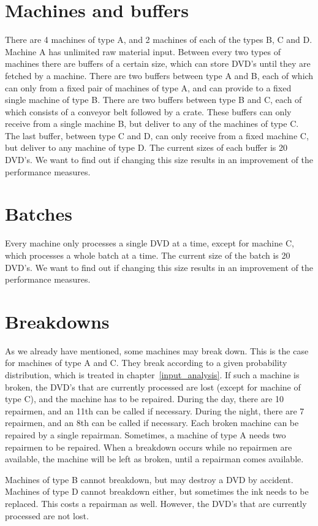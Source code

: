 \documentclass{report}
\begin{document}
\section{Machines and buffers}
There are 4 machines of type A, and 2 machines of each of the types B, C and D.
Machine A has unlimited raw material input.
Between every two types of machines there are buffers of a certain size, which can store DVD's until they are fetched by a machine.
There are two buffers between type A and B, each of which can only from a fixed pair of machines of type A, and can provide to a fixed single machine of type B.
There are two buffers between type B and C, each of which consists of a conveyor belt followed by a crate.
These buffers can only receive from a single machine B, but deliver to any of the machines of type C.
The last buffer, between type C and D, can only receive from a fixed machine C, but deliver to any machine of type D.
The current sizes of each buffer is 20 DVD's.
We want to find out if changing this size results in an improvement of the performance measures.

\section{Batches}
Every machine only processes a single DVD at a time, except for machine C, which processes a whole batch at a time.
The current size of the batch is 20 DVD's.
We want to find out if changing this size results in an improvement of the performance measures.

\section{Breakdowns}
As we already have mentioned, some machines may break down.
This is the case for machines of type A and C.
They break according to a given probability distribution, which is treated in chapter~\ref{input_analysis}.
If such a machine is broken, the DVD's that are currently processed are lost (except for machine of type C), and the machine has to be repaired.
During the day, there are 10 repairmen, and an 11th can be called if necessary.
During the night, there are 7 repairmen, and an 8th can be called if necessary.
Each broken machine can be repaired by a single repairman.
Sometimes, a machine of type A needs two repairmen to be repaired.
When a breakdown occurs while no repairmen are available, the machine will be left as broken, until a repairman comes available.

Machines of type B cannot breakdown, but may destroy a DVD by accident.
Machines of type D cannot breakdown either, but sometimes the ink needs to be replaced.
This costs a repairman as well.
However, the DVD's that are currently processed are not lost.
\end{document}
